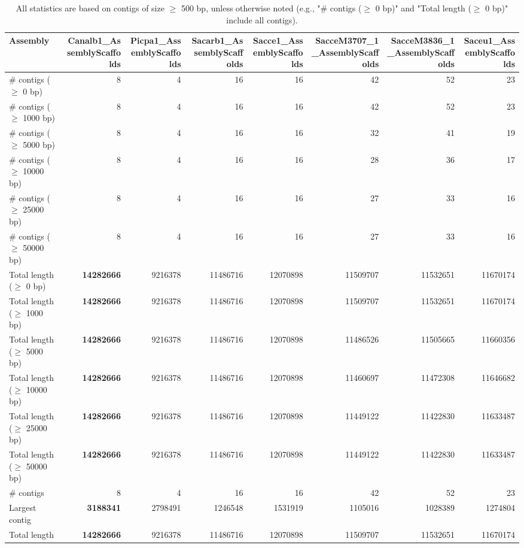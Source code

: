 \documentclass[12pt,a4paper]{article}
\begin{document}
\begin{table}[ht]
\begin{center}
\caption{All statistics are based on contigs of size $\geq$ 500 bp, unless otherwise noted (e.g., "\# contigs ($\geq$ 0 bp)" and "Total length ($\geq$ 0 bp)" include all contigs).}
\begin{tabular}{|l*{7}{|r}|}
\hline
Assembly & Canalb1\_AssemblyScaffolds & Picpa1\_AssemblyScaffolds & Sacarb1\_AssemblyScaffolds & Sacce1\_AssemblyScaffolds & SacceM3707\_1\_AssemblyScaffolds & SacceM3836\_1\_AssemblyScaffolds & Saceu1\_AssemblyScaffolds \\ \hline
\# contigs ($\geq$ 0 bp) & 8 & 4 & 16 & 16 & 42 & 52 & 23 \\ \hline
\# contigs ($\geq$ 1000 bp) & 8 & 4 & 16 & 16 & 42 & 52 & 23 \\ \hline
\# contigs ($\geq$ 5000 bp) & 8 & 4 & 16 & 16 & 32 & 41 & 19 \\ \hline
\# contigs ($\geq$ 10000 bp) & 8 & 4 & 16 & 16 & 28 & 36 & 17 \\ \hline
\# contigs ($\geq$ 25000 bp) & 8 & 4 & 16 & 16 & 27 & 33 & 16 \\ \hline
\# contigs ($\geq$ 50000 bp) & 8 & 4 & 16 & 16 & 27 & 33 & 16 \\ \hline
Total length ($\geq$ 0 bp) & {\bf 14282666} & 9216378 & 11486716 & 12070898 & 11509707 & 11532651 & 11670174 \\ \hline
Total length ($\geq$ 1000 bp) & {\bf 14282666} & 9216378 & 11486716 & 12070898 & 11509707 & 11532651 & 11670174 \\ \hline
Total length ($\geq$ 5000 bp) & {\bf 14282666} & 9216378 & 11486716 & 12070898 & 11486526 & 11505665 & 11660356 \\ \hline
Total length ($\geq$ 10000 bp) & {\bf 14282666} & 9216378 & 11486716 & 12070898 & 11460697 & 11472308 & 11646682 \\ \hline
Total length ($\geq$ 25000 bp) & {\bf 14282666} & 9216378 & 11486716 & 12070898 & 11449122 & 11422830 & 11633487 \\ \hline
Total length ($\geq$ 50000 bp) & {\bf 14282666} & 9216378 & 11486716 & 12070898 & 11449122 & 11422830 & 11633487 \\ \hline
\# contigs & 8 & 4 & 16 & 16 & 42 & 52 & 23 \\ \hline
Largest contig & {\bf 3188341} & 2798491 & 1246548 & 1531919 & 1105016 & 1028389 & 1274804 \\ \hline
Total length & {\bf 14282666} & 9216378 & 11486716 & 12070898 & 11509707 & 11532651 & 11670174 \\ \hline

\end{tabular}
\end{center}
\end{table}
\end{document}
